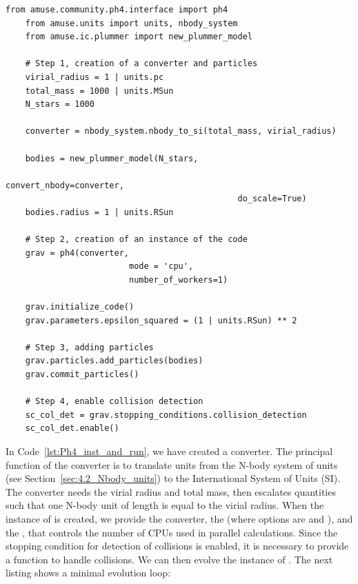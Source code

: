 \begin{lstlisting}[caption=Example setup for \texttt{Ph4} with particles, label=lst:Ph4_inst_and_run]
	from amuse.community.ph4.interface import ph4
	from amuse.units import units, nbody_system
	from amuse.ic.plummer import new_plummer_model
	
	# Step 1, creation of a converter and particles
	virial_radius = 1 | units.pc
	total_mass = 1000 | units.MSun
	N_stars = 1000
	
	converter = nbody_system.nbody_to_si(total_mass, virial_radius)
	
	bodies = new_plummer_model(N_stars, 
	                                           convert_nbody=converter, 
	                                           do_scale=True)
	bodies.radius = 1 | units.RSun
	
	# Step 2, creation of an instance of the code
	grav = ph4(converter, 
						 mode = 'cpu',
						 number_of_workers=1)
	
	grav.initialize_code()
	grav.parameters.epsilon_squared = (1 | units.RSun) ** 2
	
	# Step 3, adding particles
	grav.particles.add_particles(bodies)
	grav.commit_particles()
	
	# Step 4, enable collision detection
	sc_col_det = grav.stopping_conditions.collision_detection
	sc_col_det.enable()
\end{lstlisting}

In Code~\ref{lst:Ph4_inst_and_run}, we have created a converter. The principal function of the converter is to translate units from the N-body system of units (see Section~\ref{sec:4.2_Nbody_units}) to the International System of Units (SI). The converter needs the virial radius and total mass, then escalates quantities such that one N-body unit of length is equal to the virial radius. When the instance of  is created, we provide the converter, the  (where options are  and ), and the , that controls the number of CPUs used in parallel calculations. Since the stopping condition for detection of collisions is enabled, it is necessary to provide a function to handle collisions. We can then evolve the instance of . The next listing shows a minimal evolution loop:

